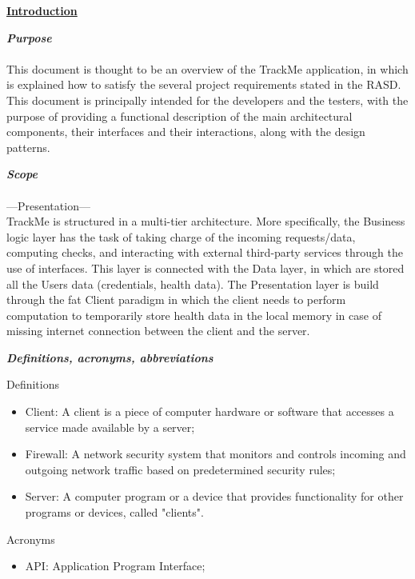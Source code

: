 	\underline{\textbf{Introduction} }
	\begin{legal}
    		\item \textit{\textbf{Purpose}}\\\\
		This document is thought to be an overview of the TrackMe application, in which is explained how to satisfy the several project requirements stated in the RASD. This document is principally intended for the developers and the testers, with the purpose of providing a functional description of the main architectural components, their interfaces and their interactions, along with the design patterns.
		\item \textit{\textbf{Scope}}\\\\
		---Presentation---\\ 
		TrackMe is structured in a multi-tier architecture. More specifically, the Business logic layer has the task of taking charge of the incoming requests/data, computing checks, and interacting with external third-party services through the use of interfaces. This layer is connected with the Data layer, in which are stored all the Users data (credentials, health data). The Presentation layer is build through the fat Client paradigm in which the client needs to perform computation to temporarily store health data in the local memory in case of missing internet connection between the client and the server.
		\item \textit{\textbf{Definitions, acronyms, abbreviations}}\\
			\begin{legal}
				\item Definitions
				\begin{itemize}
					\item Client: A client is a piece of computer hardware or software that accesses a service made available by a server;
					\item Firewall: A network security system that monitors and controls incoming and outgoing network traffic based on predetermined security rules;
					\item Server: A computer program or a device that provides functionality for other programs or devices, called "clients".
				\end{itemize}
				\item Acronyms
				\begin{itemize}
					\item API: Application Program Interface;

\end{itemize}
\end{legal}
\end{legal}
